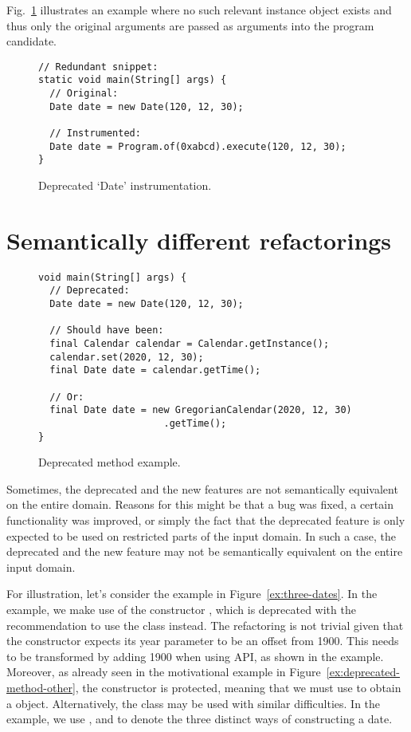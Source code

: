 \documentclass[runningheads,a4paper]{llncs}
\begin{document}
Fig.~\ref{ex:date-instrumentation} illustrates an example where no
such relevant instance object exists and thus only the original
arguments are passed as arguments into the program candidate.

\begin{figure}
\begin{lstlisting}[mathescape=true,showstringspaces=false]
// Redundant snippet:
static void main(String[] args) {
  // Original:
  Date date = new Date(120, 12, 30);

  // Instrumented:
  Date date = Program.of(0xabcd).execute(120, 12, 30);
}
\end{lstlisting}
\caption{Deprecated `Date' instrumentation.}
\label{ex:date-instrumentation}
\end{figure}

\section{Semantically different refactorings}


\begin{figure}
\begin{lstlisting}[mathescape=true,showstringspaces=false]
void main(String[] args) {
  // Deprecated:
  Date date = new Date(120, 12, 30);
 
  // Should have been:
  final Calendar calendar = Calendar.getInstance();
  calendar.set(2020, 12, 30);
  final Date date = calendar.getTime();

  // Or:
  final Date date = new GregorianCalendar(2020, 12, 30)
                      .getTime();
}
\end{lstlisting}
\caption{Deprecated method example.}
\label{ex:deprecated-method}
\end{figure}


Sometimes, the deprecated and the new features are not semantically
equivalent on the entire domain. Reasons for this might be that a bug
was fixed, a certain functionality was improved, or simply the fact
that the deprecated feature is only expected to be used on restricted
parts of the input domain. In such a case, the deprecated and the new
feature may not be semantically equivalent on the entire input domain.

For illustration, let's consider the example in Figure~\ref{ex:three-dates}.
In the example, we make use of the constructor , 
which is deprecated with the 
recommendation to use the  class instead.
The refactoring is not trivial given that the 
 constructor expects its year parameter to be an offset
from 1900.  This needs to be
transformed by adding 1900 when using  API, as shown in the
example. Moreover, as already seen in the motivational example in  Figure~\ref{ex:deprecated-method-other},
the  constructor is protected,
meaning that we must use  to obtain a
 object.
Alternatively, the  class may be used with
similar difficulties.
In the example, we use ,  and  to denote the three distinct ways of constructing a date.
\end{document}
